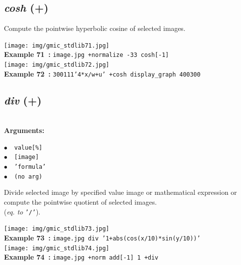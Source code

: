 \documentclass[a4paper,10.5pt,twoside]{book}
\def\comma{\discretionary{,}{}{,}}
\newcommand{\Cb}[1]{\textcolor{cb}{#1}}
\begin{document}
\subsection{\emph{cosh} (+)}\vspace*{-0.7em}
Compute the pointwise hyperbolic cosine of selected images.
\begin{center}\texttt{[image: img/gmic\_stdlib71.jpg]}\\
{\footnotesize \textbf{Example 71~:} \texttt{image.jpg +normalize -3{\comma}3 cosh[-1]}}
\\\texttt{[image: img/gmic\_stdlib72.jpg]}\\
{\footnotesize \textbf{Example 72~:} \texttt{300{\comma}1{\comma}1{\comma}1{\comma}'4*x/w+u' +cosh display\_graph 400{\comma}300}}
\end{center}

\subsection{\emph{div} (+)}\vspace*{-0.7em}
~\\\textbf{\Cb{Arguments: }}\begin{flushleft}
{\small \Cb{\hspace*{0.5cm}$\bullet$~~\texttt{value[\%]}}}~~~\\
{\small \Cb{\hspace*{0.5cm}$\bullet$~~\texttt{[image]}}}~~~\\
{\small \Cb{\hspace*{0.5cm}$\bullet$~~\texttt{'formula'}}}~~~\\
{\small \Cb{\hspace*{0.5cm}$\bullet$~~\texttt{(no arg)}}}\end{flushleft}
Divide selected image by specified value{\comma} image or mathematical expression{\comma}
or compute the pointwise quotient of selected images.
~\\(\emph{eq. to} {\small \texttt{'/'}}).
\begin{center}\texttt{[image: img/gmic\_stdlib73.jpg]}\\
{\footnotesize \textbf{Example 73~:} \texttt{image.jpg div '1+abs(cos(x/10)*sin(y/10))'}}
\\\texttt{[image: img/gmic\_stdlib74.jpg]}\\
{\footnotesize \textbf{Example 74~:} \texttt{image.jpg +norm add[-1] 1 +div}}
\end{center}
\end{document}
